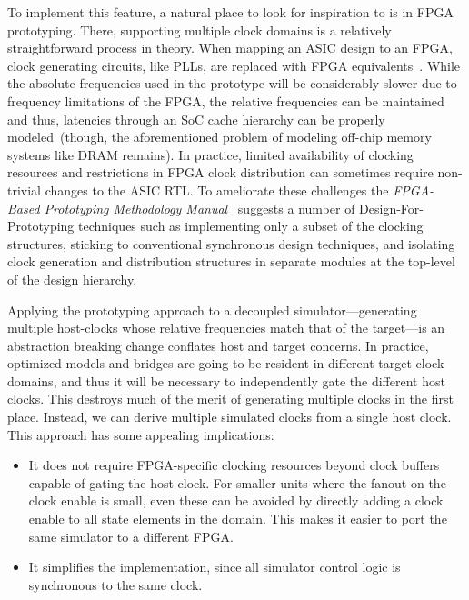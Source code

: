 To implement this feature, a natural place to look for inspiration to is in FPGA prototyping. There, supporting multiple clock domains is a relatively
straightforward process in theory. When mapping an ASIC design to an FPGA,
clock generating circuits, like PLLs, are replaced with FPGA
equivalents~\cite{FPMM}. While the absolute frequencies used in the prototype
will be considerably slower due to frequency limitations of the FPGA, the
relative frequencies can be maintained and thus, latencies through an SoC cache
hierarchy can be properly modeled~(though, the aforementioned problem of modeling
off-chip memory systems like DRAM remains).  In practice, limited availability
of clocking resources and restrictions in FPGA clock distribution can sometimes
require non-trivial changes to the ASIC RTL. To ameliorate these challenges the
\emph{FPGA-Based Prototyping Methodology Manual}~\cite{FPMM} suggests a number
of Design-For-Prototyping techniques such as implementing only a subset of
the clocking structures, sticking to conventional synchronous design
techniques, and isolating clock generation and distribution structures in
separate modules at the top-level of the design hierarchy.

Applying the prototyping approach to a decoupled simulator---generating
multiple host-clocks whose relative frequencies match that of the target---is
an abstraction breaking change conflates host and target concerns.  In practice,
optimized models and bridges are going to be resident in different target clock
domains, and thus it will be necessary to independently gate the different
host clocks. This destroys much of the merit of generating multiple clocks in
the first place. Instead, we can derive multiple simulated clocks from a single
host clock. This approach has some appealing implications:
\begin{itemize}
 \item It does not require FPGA-specific clocking resources beyond clock
 buffers capable of gating the host clock. For smaller units where the fanout
 on the clock enable is small, even these can be avoided by directly adding a clock enable
 to all state elements in the domain. This makes it easier
 to port the same simulator to a different FPGA.

 \item It simplifies the implementation, since all simulator control logic is synchronous to 
 the same clock.
\end{itemize}

